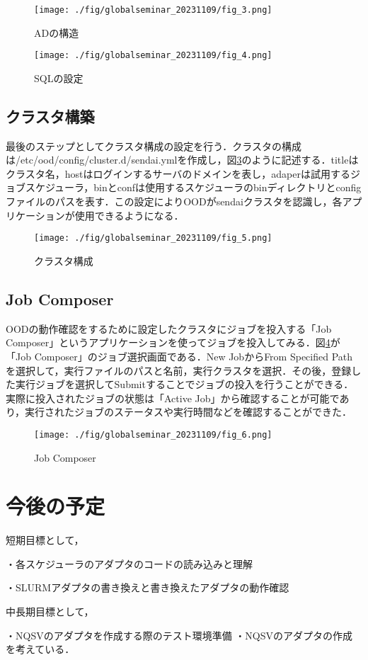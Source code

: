 \documentclass[a4paper,oneside,twocolumn,notitlepage,dvipdfmx]{jsarticle}
\begin{document}
\begin{figure}[h]
  \centering
  \texttt{[image: ./fig/globalseminar\_20231109/fig\_3.png]}
  \caption{ADの構造}
  \label{fig_3}
\end{figure}

\begin{figure}[h]
  \centering
  \texttt{[image: ./fig/globalseminar\_20231109/fig\_4.png]}
  \caption{SQLの設定}
  \label{fig_4}
\end{figure}

\subsection{クラスタ構築}
最後のステップとしてクラスタ構成の設定を行う．クラスタの構成は/etc/ood/config/cluster.d/sendai.ymlを作成し，図\ref{fig_5}のように記述する．titleはクラスタ名，hostはログインするサーバのドメインを表し，adaperは試用するジョブスケジューラ，binとconfは使用するスケジューラのbinディレクトリとconfigファイルのパスを表す．この設定によりOODがsendaiクラスタを認識し，各アプリケーションが使用できるようになる．\par

\begin{figure}[h]
  \centering
  \texttt{[image: ./fig/globalseminar\_20231109/fig\_5.png]}
  \caption{クラスタ構成}
  \label{fig_5}
\end{figure}

\subsection{Job Composer}
OODの動作確認をするために設定したクラスタにジョブを投入する「Job Composer」というアプリケーションを使ってジョブを投入してみる．図\ref{fig_6}が「Job Composer」のジョブ選択画面である．New JobからFrom Specified Pathを選択して，実行ファイルのパスと名前，実行クラスタを選択．その後，登録した実行ジョブを選択してSubmitすることでジョブの投入を行うことができる．実際に投入されたジョブの状態は「Active Job」から確認することが可能であり，実行されたジョブのステータスや実行時間などを確認することができた．\par

\begin{figure}[h]
  \centering
  \texttt{[image: ./fig/globalseminar\_20231109/fig\_6.png]}
  \caption{Job Composer}
  \label{fig_6}
\end{figure}


\section{今後の予定}
短期目標として，\par
・各スケジューラのアダプタのコードの読み込みと理解\par
・SLURMアダプタの書き換えと書き換えたアダプタの動作確認\par
中長期目標として，\par
・NQSVのアダプタを作成する際のテスト環境準備
・NQSVのアダプタの作成
を考えている．\par





\end{document}
